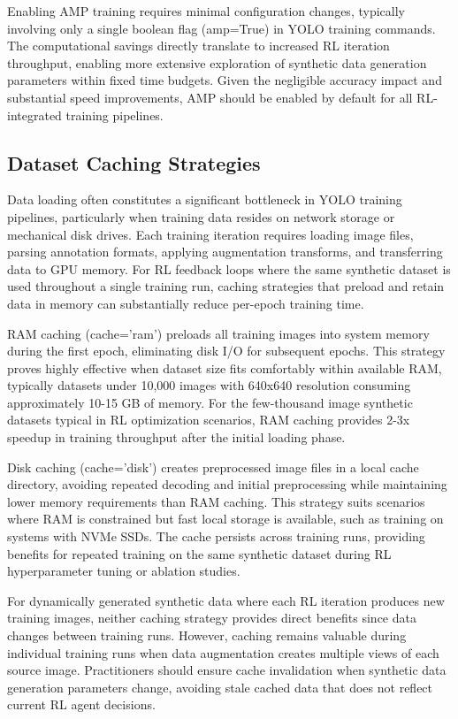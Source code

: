Enabling AMP training requires minimal configuration changes, typically involving only a single boolean flag (amp=True) in YOLO training commands. The computational savings directly translate to increased RL iteration throughput, enabling more extensive exploration of synthetic data generation parameters within fixed time budgets. Given the negligible accuracy impact and substantial speed improvements, AMP should be enabled by default for all RL-integrated training pipelines.

\subsection{Dataset Caching Strategies}

Data loading often constitutes a significant bottleneck in YOLO training pipelines, particularly when training data resides on network storage or mechanical disk drives. Each training iteration requires loading image files, parsing annotation formats, applying augmentation transforms, and transferring data to GPU memory. For RL feedback loops where the same synthetic dataset is used throughout a single training run, caching strategies that preload and retain data in memory can substantially reduce per-epoch training time.

RAM caching (cache='ram') preloads all training images into system memory during the first epoch, eliminating disk I/O for subsequent epochs. This strategy proves highly effective when dataset size fits comfortably within available RAM, typically datasets under 10,000 images with 640x640 resolution consuming approximately 10-15 GB of memory. For the few-thousand image synthetic datasets typical in RL optimization scenarios, RAM caching provides 2-3x speedup in training throughput after the initial loading phase.

Disk caching (cache='disk') creates preprocessed image files in a local cache directory, avoiding repeated decoding and initial preprocessing while maintaining lower memory requirements than RAM caching. This strategy suits scenarios where RAM is constrained but fast local storage is available, such as training on systems with NVMe SSDs. The cache persists across training runs, providing benefits for repeated training on the same synthetic dataset during RL hyperparameter tuning or ablation studies.

For dynamically generated synthetic data where each RL iteration produces new training images, neither caching strategy provides direct benefits since data changes between training runs. However, caching remains valuable during individual training runs when data augmentation creates multiple views of each source image. Practitioners should ensure cache invalidation when synthetic data generation parameters change, avoiding stale cached data that does not reflect current RL agent decisions.

